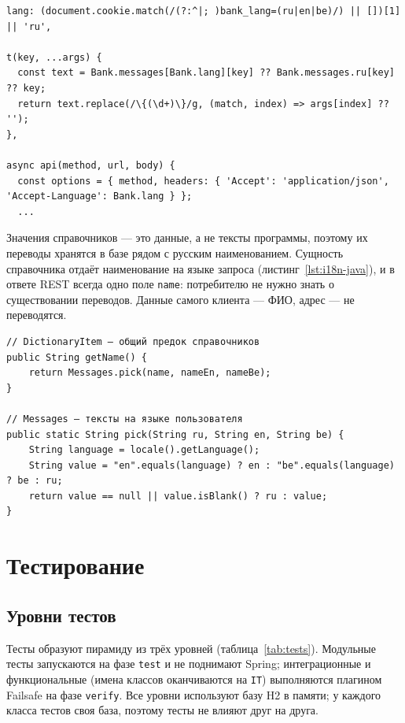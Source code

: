 \documentclass[14pt,a4paper]{extarticle}
\begin{document}
\begin{lstlisting}[style=js, caption={Выбор текста и передача языка сервису (\texttt{ui-kit/bank.js})}, label={lst:i18n-js}]
lang: (document.cookie.match(/(?:^|; )bank_lang=(ru|en|be)/) || [])[1] || 'ru',

t(key, ...args) {
  const text = Bank.messages[Bank.lang][key] ?? Bank.messages.ru[key] ?? key;
  return text.replace(/\{(\d+)\}/g, (match, index) => args[index] ?? '');
},

async api(method, url, body) {
  const options = { method, headers: { 'Accept': 'application/json', 'Accept-Language': Bank.lang } };
  ...
\end{lstlisting}

Значения справочников --- это данные, а не тексты программы, поэтому их переводы хранятся
в базе рядом с русским наименованием. Сущность справочника отдаёт наименование на языке
запроса (листинг~\ref{lst:i18n-java}), и в ответе REST всегда одно поле \texttt{name}:
потребителю не нужно знать о существовании переводов. Данные самого клиента --- ФИО, адрес ---
не переводятся.

\begin{lstlisting}[style=java, caption={Наименование справочника на языке запроса}, label={lst:i18n-java}]
// DictionaryItem — общий предок справочников
public String getName() {
    return Messages.pick(name, nameEn, nameBe);
}

// Messages — тексты на языке пользователя
public static String pick(String ru, String en, String be) {
    String language = locale().getLanguage();
    String value = "en".equals(language) ? en : "be".equals(language) ? be : ru;
    return value == null || value.isBlank() ? ru : value;
}
\end{lstlisting}

\section{Тестирование}

\subsection{Уровни тестов}

Тесты образуют пирамиду из трёх уровней (таблица~\ref{tab:tests}). Модульные тесты
запускаются на фазе \texttt{test} и не поднимают Spring; интеграционные и функциональные
(имена классов оканчиваются на \texttt{IT}) выполняются плагином Failsafe на фазе
\texttt{verify}. Все уровни используют базу H2 в памяти; у каждого класса тестов своя база,
поэтому тесты не влияют друг на друга.
\end{document}
